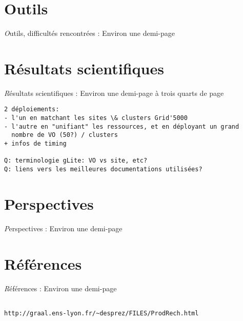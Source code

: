 \documentclass[a4paper,11pt]{article}
\newcommand{\todo}[1]{{\color{red}\textsl #1}}
\begin{document}
\section{Outils}
\todo{Outils, difficultés rencontrées : Environ une demi-page}

\section{Résultats scientifiques}
\todo{Résultats scientifiques : Environ une demi-page à trois quarts de page}

\begin{verbatim}
2 déploiements:
- l'un en matchant les sites \& clusters Grid'5000
- l'autre en "unifiant" les ressources, et en déployant un grand
  nombre de VO (50?) / clusters
+ infos de timing

Q: terminologie gLite: VO vs site, etc?
Q: liens vers les meilleures documentations utilisées?
\end{verbatim}

\section{Perspectives}
\todo{Perspectives : Environ une demi-page}

\section{Références}
\todo{Références : Environ une demi-page}

\begin{verbatim}

http://graal.ens-lyon.fr/~desprez/FILES/ProdRech.html
\end{verbatim}
\end{document}
